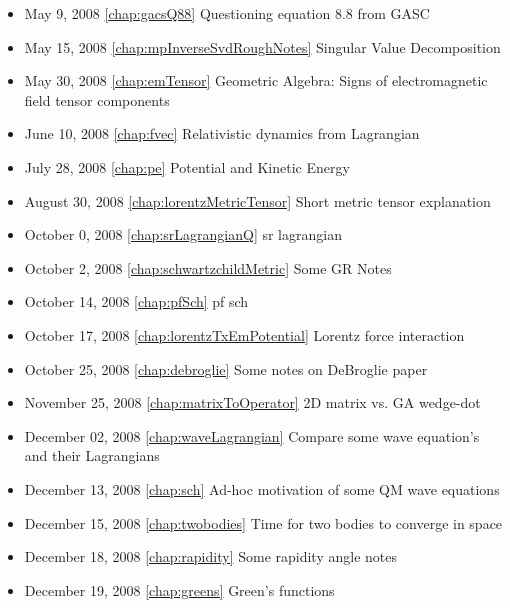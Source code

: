 \begin{itemize}
\item May 9, 2008 \ref{chap:gacsQ88} Questioning equation 8.8 from GASC

\item May 15, 2008 \ref{chap:mpInverseSvdRoughNotes} Singular Value Decomposition

\item May 30, 2008 \ref{chap:emTensor} Geometric Algebra: Signs of electromagnetic field tensor components

\item June 10, 2008 \ref{chap:fvec} Relativistic dynamics from Lagrangian

\item July 28, 2008 \ref{chap:pe} Potential and Kinetic Energy

\item August 30, 2008 \ref{chap:lorentzMetricTensor} Short metric tensor explanation

\item October 0, 2008 \ref{chap:srLagrangianQ} sr lagrangian

\item October 2, 2008 \ref{chap:schwartzchildMetric} Some GR Notes

\item October 14, 2008 \ref{chap:pfSch} pf sch

\item October 17, 2008 \ref{chap:lorentzTxEmPotential} Lorentz force interaction

\item October 25, 2008 \ref{chap:debroglie} Some notes on DeBroglie paper

\item November 25, 2008 \ref{chap:matrixToOperator} 2D matrix vs. GA wedge-dot

\item December 02, 2008 \ref{chap:waveLagrangian} Compare some wave equation's and their Lagrangians

\item December 13, 2008 \ref{chap:sch} Ad-hoc motivation of some QM wave equations

\item December 15, 2008 \ref{chap:twobodies} Time for two bodies to converge in space

\item December 18, 2008 \ref{chap:rapidity} Some rapidity angle notes

\item December 19, 2008 \ref{chap:greens} Green's functions


\end{itemize}
